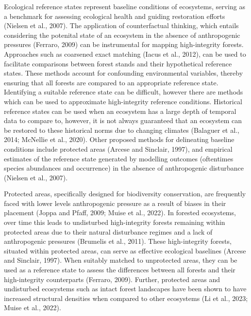 \documentclass[
]{agujournal2019}
\begin{document}
Ecological reference states represent baseline conditions of ecosystems,
serving as a benchmark for assessing ecological health and guiding
restoration efforts (Nielsen et al., 2007). The application of
counterfactual thinking, which entails considering the potenital state
of an ecosystem in the absence of anthropogenic pressures (Ferraro,
2009) can be instrumental for mapping high-integrity forests. Approaches
such as coarsened exact matching (Iacus et al., 2012), can be used to
facilitate comparisons between forest stands and their hypothetical
reference states. These methods account for confounding environmental
variables, thereby ensuring that all forests are compared to an
appropriate reference state. Identifying a suitable reference state can
be difficult, however there are methods which can be used to approximate
high-integrity reference conditions. Historical reference states can be
used when an ecosystem has a large depth of temporal data to compare to,
however, it is not always guaranteed that an ecosystem can be restored
to these historical norms due to changing climates (Balaguer et al.,
2014; McNellie et al., 2020). Other proposed methods for delineating
baseline conditions include protected areas (Arcese and Sinclair, 1997),
and empirical estimates of the reference state generated by modelling
outcomes (oftentimes species abundances and occurrence) in the absence
of anthropogenic disturbance (Nielsen et al., 2007).

Protected areas, specifically designed for biodiversity conservation,
are frequently faced with lower levels anthropogenic pressure as a
result of biases in their placement (Joppa and Pfaff, 2009; Muise et
al., 2022). In forested ecosystems, over time this leads to undisturbed
high-integrity forests remaining within protected areas due to their
natural disturbance regimes and a lack of anthropogenic pressures
(Brumelis et al., 2011). These high-integrity forests, situated within
protected areas, can serve as effective ecological baselines (Arcese and
Sinclair, 1997). When suitably matched to unprotected areas, they can be
used as a reference state to assess the differences between all forests
and their high-integrity counterparts (Ferraro, 2009). Further,
protected areas and undisturbed ecosystems such as intact forest
landscapes have been shown to have increased structural densities when
compared to other ecosystems (Li et al., 2023; Muise et al., 2022).
\end{document}

